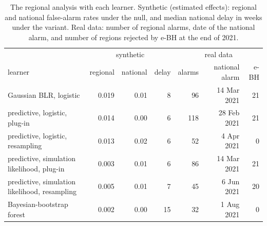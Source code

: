 \begin{table}[t]
\centering
\caption{The regional analysis with each learner. Synthetic (estimated
effects): regional and national false-alarm rates under the null, and median
national delay in weeks under the variant. Real data: number of regional
alarms, date of the national alarm, and number of regions rejected by e-BH at
the end of 2021.}
\label{tab:regions-learners}
\begin{tabular}{lrrrrrr}
\toprule
 & \multicolumn{3}{c}{synthetic} & \multicolumn{3}{c}{real data} \\
learner & regional & national & delay & alarms & national alarm & e-BH \\
\midrule
Gaussian BLR, logistic & 0.019 & 0.01 & 8 & 96 & 14 Mar 2021 & 21 \\
predictive, logistic, plug-in & 0.014 & 0.00 & 6 & 118 & 28 Feb 2021 & 21 \\
predictive, logistic, resampling & 0.013 & 0.02 & 6 & 52 & 4 Apr 2021 & 0 \\
predictive, simulation likelihood, plug-in & 0.003 & 0.01 & 6 & 86 & 14 Mar 2021 & 21 \\
predictive, simulation likelihood, resampling & 0.005 & 0.01 & 7 & 45 & 6 Jun 2021 & 20 \\
Bayesian-bootstrap forest & 0.002 & 0.00 & 15 & 32 & 1 Aug 2021 & 0 \\
\bottomrule
\end{tabular}
\end{table}


